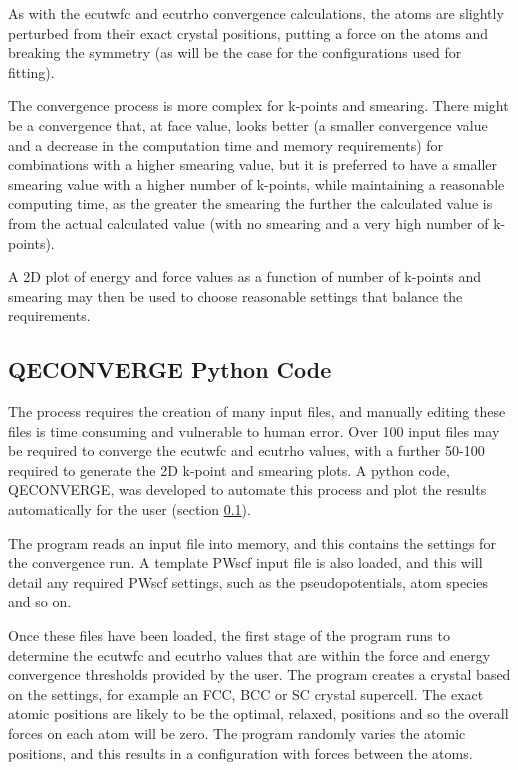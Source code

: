 As with the ecutwfc and ecutrho convergence calculations, the atoms are slightly perturbed from their exact crystal positions, putting a force on the atoms and breaking the symmetry (as will be the case for the configurations used for fitting). 

The convergence process is more complex for k-points and smearing.  There might be a convergence that, at face value, looks better (a smaller convergence value and a decrease in the computation time and memory requirements) for combinations with a higher smearing value, but it is preferred to have a smaller smearing value with a higher number of k-points, while maintaining a reasonable computing time, as the greater the smearing the further the calculated value is from the actual calculated value (with no smearing and a very high number of k-points).

A 2D plot of energy and force values as a function of number of k-points and smearing may then be used to choose reasonable settings that balance the requirements.



\FloatBarrier
\subsection{QECONVERGE Python Code}
\label{code:qeconverge}

The process requires the creation of many input files, and manually editing these files is time consuming and vulnerable to human error. Over 100 input files may be required to converge the ecutwfc and ecutrho values, with a further 50-100 required to generate the 2D k-point and smearing plots.  A python code, QECONVERGE, was developed to automate this process and plot the results automatically for the user (section \ref{code:qeconverge}).

The program reads an input file into memory, and this contains the settings for the convergence run.  A template PWscf input file is also loaded, and this will detail any required PWscf settings, such as the pseudopotentials, atom species and so on.  

Once these files have been loaded, the first stage of the program runs to determine the ecutwfc and ecutrho values that are within the force and energy convergence thresholds provided by the user.  The program creates a crystal based on the settings, for example an FCC, BCC or SC crystal supercell.  The exact atomic positions are likely to be the optimal, relaxed, positions and so the overall forces on each atom will be zero.  The program randomly varies the atomic positions, and this results in a configuration with forces between the atoms.

